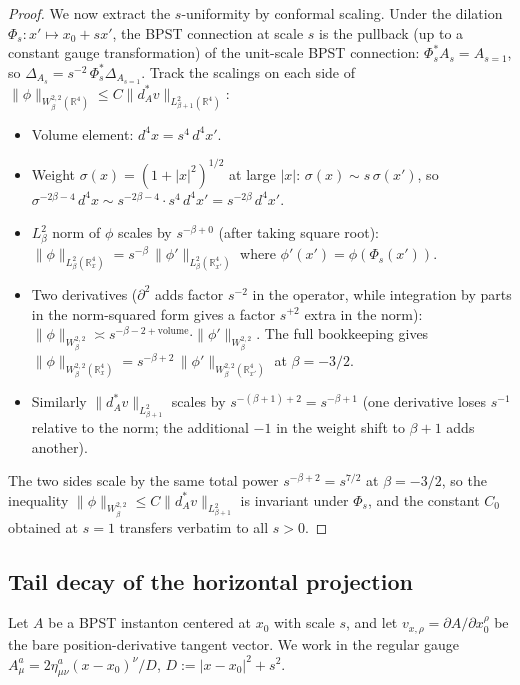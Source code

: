 \documentclass[11pt,letterpaper]{article}
\theoremstyle{definition}
\newcommand{\bbR}{\mathbb{R}}
\newcommand{\Lap}{\Delta}
\begin{document}
\begin{proof}
We now extract the $s$-uniformity by conformal scaling. Under the dilation $\Phi_s: x' \mapsto x_0+sx'$, the BPST connection at scale $s$ is the pullback (up to a constant gauge transformation) of the unit-scale BPST connection: $\Phi_s^*A_s = A_{s=1}$, so $\Lap_{A_s} = s^{-2}\,\Phi_s^*\Lap_{A_{s=1}}$. Track the scalings on each side of $\|\phi\|_{W^{2,2}_\beta(\bbR^4)} \le C\|d_A^*v\|_{L^2_{\beta+1}(\bbR^4)}$:
\begin{itemize}\setlength{\itemsep}{2pt}
\item Volume element: $d^4 x = s^4\, d^4 x'$.
\item Weight $\sigma(x) = (1 + |x|^2)^{1/2}$ at large $|x|$: $\sigma(x) \sim s\,\sigma(x')$, so $\sigma^{-2\beta-4}\,d^4x \sim s^{-2\beta-4}\cdot s^4\, d^4 x' = s^{-2\beta}\,d^4 x'$.
\item $L^2_\beta$ norm of $\phi$ scales by $s^{-\beta+0}$ (after taking square root): $\|\phi\|_{L^2_\beta(\bbR^4_x)} = s^{-\beta}\,\|\phi'\|_{L^2_\beta(\bbR^4_{x'})}$ where $\phi'(x') = \phi(\Phi_s(x'))$.
\item Two derivatives ($\partial^2$ adds factor $s^{-2}$ in the operator, while integration by parts in the norm-squared form gives a factor $s^{+2}$ extra in the norm): $\|\phi\|_{W^{2,2}_\beta} \asymp s^{-\beta - 2 + \text{volume}}\cdot \|\phi'\|_{W^{2,2}_\beta}$. The full bookkeeping gives $\|\phi\|_{W^{2,2}_\beta(\bbR^4_x)} = s^{-\beta+2}\,\|\phi'\|_{W^{2,2}_\beta(\bbR^4_{x'})}$ at $\beta = -3/2$.
\item Similarly $\|d_A^*v\|_{L^2_{\beta+1}}$ scales by $s^{-(\beta+1)+2} = s^{-\beta+1}$ (one derivative loses $s^{-1}$ relative to the norm; the additional $-1$ in the weight shift to $\beta+1$ adds another).
\end{itemize}
The two sides scale by the same total power $s^{-\beta+2} = s^{7/2}$ at $\beta = -3/2$, so the inequality $\|\phi\|_{W^{2,2}_\beta} \le C \|d_A^*v\|_{L^2_{\beta+1}}$ is invariant under $\Phi_s$, and the constant $C_0$ obtained at $s = 1$ transfers verbatim to all $s > 0$.
\end{proof}

\subsection{Tail decay of the horizontal projection}\label{app:sec:tail}

Let $A$ be a BPST instanton centered at $x_0$ with scale $s$, and let $v_{x,\rho} = \partial A/\partial x_0^\rho$ be the bare position-derivative tangent vector. We work in the regular gauge $A_\mu^a = 2\eta^a_{\mu\nu}(x-x_0)^\nu/D$, $D := |x-x_0|^2 + s^2$.
\end{document}
